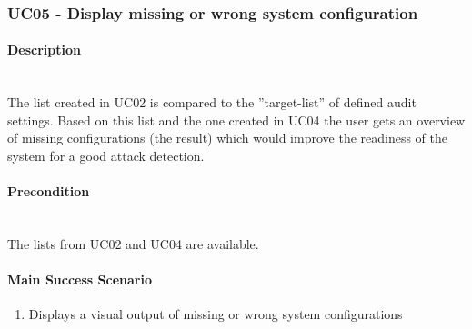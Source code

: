 \subsubsection{UC05 - Display missing or wrong system configuration}\label{UC05}
\begin{tcolorbox}
    \paragraph{Description} \ \\
    The list created in UC02 is compared to the ''target-list'' of defined audit settings. Based on this list and the one created in UC04 the user gets an overview of missing configurations (the result) which would improve the readiness of the system for a good attack detection.
    \ \\
    \paragraph{Precondition} \ \\
    The lists from UC02 and UC04 are available.
    \ \\
    \paragraph{Main Success Scenario} 
    \begin{enumerate}
        \item Displays a visual output of missing or wrong system configurations
    \end{enumerate}   
\end{tcolorbox}


